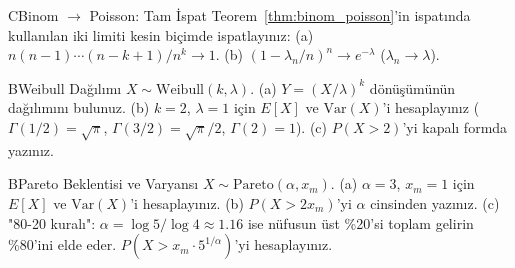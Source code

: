 \begin{alistirma}[Al.5.12]{C}{Binom $\to$ Poisson: Tam İspat}
Teorem~\ref{thm:binom_poisson}'in ispatında kullanılan iki limiti kesin biçimde ispatlayınız:
(a) $n(n-1)\cdots(n-k+1)/n^k \to 1$.
(b) $(1 - \lambda_n/n)^n \to e^{-\lambda}$ ($\lambda_n \to \lambda$).
\end{alistirma}

\begin{alistirma}[Al.5.13]{B}{Weibull Dağılımı}
$X \sim \mathrm{Weibull}(k, \lambda)$.
(a) $Y = (X/\lambda)^k$ dönüşümünün dağılımını bulunuz.
(b) $k = 2$, $\lambda = 1$ için $E[X]$ ve $\mathrm{Var}(X)$'i hesaplayınız
    ($\Gamma(1/2) = \sqrt{\pi}$, $\Gamma(3/2) = \sqrt{\pi}/2$, $\Gamma(2) = 1$).
(c) $P(X > 2)$'yi kapalı formda yazınız.
\end{alistirma}

\begin{alistirma}[Al.5.14]{B}{Pareto Beklentisi ve Varyansı}
$X \sim \mathrm{Pareto}(\alpha, x_m)$.
(a) $\alpha = 3$, $x_m = 1$ için $E[X]$ ve $\mathrm{Var}(X)$'i hesaplayınız.
(b) $P(X > 2x_m)$'yi $\alpha$ cinsinden yazınız.
(c) "80-20 kuralı": $\alpha = \log 5/\log 4 \approx 1.16$ ise nüfusun üst \%20'si
    toplam gelirin \%80'ini elde eder. $P(X > x_m \cdot 5^{1/\alpha})$'yi hesaplayınız.
\end{alistirma}

